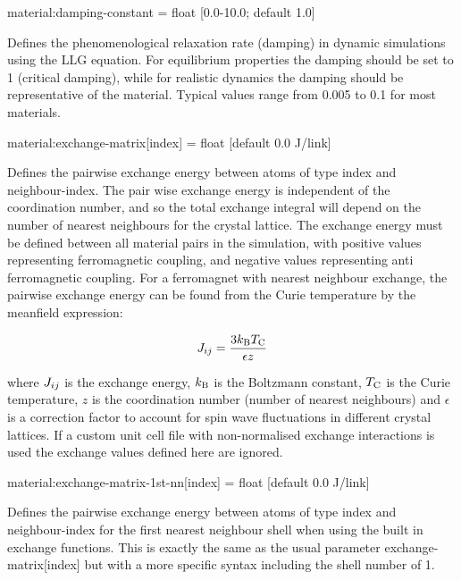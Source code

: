 {\zicf material:damping-constant = float [0.0-10.0; default 1.0]} Defines the phenomenological relaxation rate (damping) in dynamic simulations using the LLG equation. For equilibrium properties the damping should be set to 1 (critical damping), while for realistic dynamics the damping should be representative of the material. Typical values range from 0.005 to 0.1 for most materials.

{\zicf material:exchange-matrix[index] = float [default 0.0 J/link]} Defines the pairwise exchange energy between atoms of type index and neighbour-index. The pair wise exchange energy is independent of the coordination number, and so the total exchange integral will depend on the number of nearest neighbours for the crystal lattice. The exchange energy must be defined between all material pairs in the simulation, with positive values representing ferromagnetic coupling, and
negative values representing anti ferromagnetic coupling. For a ferromagnet with nearest neighbour exchange, the pairwise exchange energy can be found from the Curie temperature by the meanfield expression:

\begin{equation*}
J_{ij} = \frac{3k_\mathrm{B}T_{\mathrm{C}}}{\epsilon z}
\end{equation*}

\noindent where $J_{ij}$ is the exchange energy, $k_\mathrm{B}$ is the Boltzmann constant, $T_{\mathrm{C}}$ is the Curie temperature, $z$ is the coordination number (number of nearest neighbours) and $\epsilon$ is a correction factor to account for spin wave fluctuations in different crystal lattices. If a custom unit cell file with non-normalised exchange interactions is used the exchange values defined here are ignored.

{\zicf material:exchange-matrix-1st-nn[index] = float [default 0.0 J/link]} Defines the pairwise exchange energy between atoms of type index and neighbour-index for the first nearest neighbour shell when using the built in exchange functions. This is exactly the same as the usual parameter exchange-matrix[index] but with a more specific syntax including the shell number of 1.

